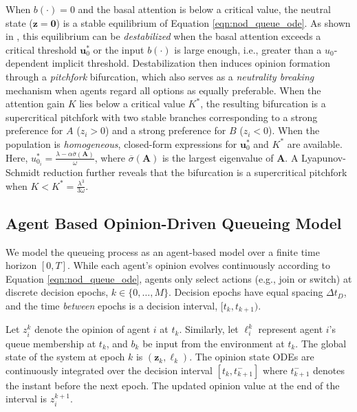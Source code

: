 \documentclass[conference]{IEEEtran}
\begin{document}
When $b(\cdot) = 0$ and the basal attention is below a critical value, the neutral state ($\boldsymbol{z} = \boldsymbol{0}$) is a stable equilibrium of Equation \eqref{eqn:nod_queue_ode}. As shown in \cite{bizyaeva2022nonlinear}, this equilibrium can be \emph{destabilized} when the basal attention exceeds a critical threshold $\boldsymbol{u}^*_0$ or the input $b(\cdot)$ is large enough, i.e., greater than a $u_0$-dependent implicit threshold. 
Destabilization then induces opinion formation through a \emph{pitchfork} bifurcation, which also serves as a \emph{neutrality breaking} mechanism when agents regard all options as equally preferable.  
When the attention gain $K$ lies below a critical value $K^*$, the resulting bifurcation is a supercritical pitchfork with two stable branches corresponding to a strong preference for $A$ ($z_i > 0$) and a strong preference for $B$ ($z_i < 0$).
When the population is \emph{homogeneous}, closed-form expressions for $\boldsymbol{u}^*_0$ and $K^*$ are available. Here, $u^*_{0_i} = \frac{\lambda - \alpha \overline{\sigma}(\boldsymbol{A})}{\omega}$, where $\overline{\sigma}(\boldsymbol{A})$ is the largest eigenvalue of $\boldsymbol{A}$. A Lyapunov-Schmidt reduction further reveals that the bifurcation is a supercritical pitchfork when $K < K^* = \frac{\lambda^3}{3 \omega}$.  

\subsection{Agent Based Opinion-Driven Queueing Model}
We model the queueing process as an agent-based model over a finite time horizon $[0,T]$. 
While each agent's opinion evolves continuously according to Equation \eqref{eqn:nod_queue_ode}, 
agents only select actions (e.g., join or switch) at discrete decision epochs, $k \in \{0, \dots, M\}$. 
Decision epochs have equal spacing $\Delta t_D$, and the time \emph{between} epochs is a decision interval, $[t_{k}, t_{k+1})$. 

Let $z^k_i$ denote the opinion of agent $i$ at $t_k$. Similarly, let $\ell^k_i$ represent agent $i$'s queue membership at $t_k$, and $b_k$ be input from the environment at $t_k$. The global state of the system at epoch $k$ is $(\boldsymbol{z}_k, \boldsymbol{\ell}_k)$.
The opinion state ODEs are continuously integrated over the decision interval $[t_k, t^-_{k+1}]$ where $t^-_{k+1}$ denotes the instant before the next epoch. The updated opinion value at the end of the interval is $z^{k+1}_i$.
\end{document}
